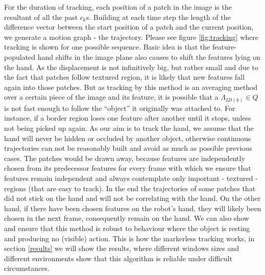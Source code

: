 \documentclass[conference]{IEEEtran}
\begin{document}
For the duration of tracking, each position of a patch in the image is the resultant of all the past $c_k$s. Building at each time step the length of the difference vector between the start position of a patch and the current position, we generate a motion graph - the trajectory. Please see figure \ref{fig:tracking} where tracking is shown for one possible sequence.
Basic idea is that the feature-populated hand shifts in the image plane also causes to shift the features lying on the hand. As the displacement is not infinitively big, but rather small and due to the fact that patches follow textured region, it is likely that new features fall again into those patches. But as tracking by this method is an averaging method over a certain piece of the image and its feature, it is possible that a $\Lambda_{ID\left( k \right) } \in Q$ is not fast enough to follow the ``object'' it originally was attached to. For instance, if a border region loses one feature after another until it stops, unless not being picked up again. As our aim is to track the hand, we assume that the hand will never be hidden or occluded by another object, otherwise continuous trajectories can not be reasonably built and avoid as much as possible previous cases.  The patches would be drawn away, because features are independently chosen from its predecessor features for every frame with which we ensure that features remain independent and always contemplate only important - textured - regions (that are easy to track). In the end the trajectories of some patches that did not stick on the hand and will not be correlating with the hand. On the other hand, if there have been chosen features on the robot's hand, they will likely been chosen in the next frame, consequently remain on the hand. We can also show and ensure that this method is robust to behaviour where the object is resting and producing no (visible) action. This is how the markerless tracking works, in section \ref{results} we will show the results, where different windows sizes and different environments show that this algorithm is reliable under difficult circumstances. 
\end{document}
